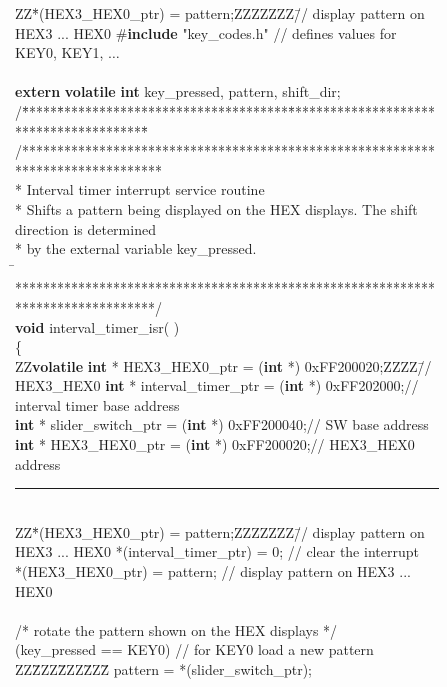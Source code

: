 \begin{figure}[h!]
\begin{center}
\begin{minipage}[t]{12.5 cm}
\begin{tabbing}
ZZ\=*(HEX3\_HEX0\_ptr) = pattern;ZZZZZZZ\=// display pattern on HEX3 ... HEX0\kill
\#{\bf include} "key\_codes.h" \>\>// defines values for KEY0, KEY1, $\ldots$\\
~\\
{\bf extern} {\bf volatile} {\bf int} key\_pressed, pattern, shift\_dir;\\
/\=*****\=*********************************\=****************************************\=\kill
/********************************************************************************\\
\>* Interval timer interrupt service routine\\
\>* Shifts a pattern being displayed on the HEX displays. The shift direction is determined \\
\>* by the external variable key\_pressed.\\
\=\kill
\>********************************************************************************/\\
{\bf void} interval\_timer\_isr( )\\
\{\\
ZZ\={\bf volatile} {\bf int} * HEX3\_HEX0\_ptr	= ({\bf int} *) 0xFF200020;ZZZZ\=// HEX3\_HEX0\kill
{} {\bf int} * interval\_timer\_ptr = ({\bf int} *) 0xFF202000;\>// interval timer base address\\
 {\bf int} * slider\_switch\_ptr = ({\bf int} *) 0xFF200040;\>// SW base address\\
 {\bf int} * HEX3\_HEX0\_ptr	= ({\bf int} *) 0xFF200020;\>// HEX3\_HEX0 address\\
\rule{6.0in}{0in}~\\
ZZ\=*(HEX3\_HEX0\_ptr) = pattern;ZZZZZZZ\=// display pattern on HEX3 ... HEX0\kill
\>*(interval\_timer\_ptr) = 0; \>// clear the interrupt\\
\>*(HEX3\_HEX0\_ptr) = pattern; \>// display pattern on HEX3 ... HEX0\\
\\
\>/* rotate the pattern shown on the HEX displays */\\
 (key\_pressed == KEY0)	\>// for KEY0 load a new pattern\\
ZZ\=ZZZ\=ZZZ\=ZZZ\=\kill
\>\>pattern = *(slider\_switch\_ptr);\\

\end{tabbing}
\end{minipage}
\end{center}
\end{figure}
